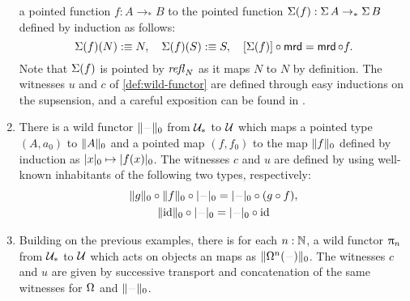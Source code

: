 \documentclass[english,a4]{article}
\def\githubpath{\tt\small}
\renewcommand{\ap}[1]{\left[{#1}\right]}
\newcommand{\ptdto}{\to_\ast}%
\newcommand{\setTrunc}[1]{\Trunc{#1}_0}
\newcommand{\settrunc}[1]{\trunc{#1}_0}
\newcommand{\UUptd}{\UU_{\ast}}
\begin{document}
\begin{example}
\begin{enumerate}
      a pointed function $f:A\ptdto B$ to the pointed function $\susp (f) :
      \susp A \ptdto \susp B$ defined by induction as follows:
      \begin{displaymath}
        \susp (f) (N) \defequi N,\quad
        \susp (f) (S) \defequi S,\quad
        \ap{\susp (f)} \circ \mrd = \mrd \circ f.
      \end{displaymath}
      Note that $\operatorname{\Sigma} (f)$ is pointed by $\mathop{{\mathit{refl}}_{N}}$ as it maps $N$ to $N$
      by definition. The witnesses $u$ and $c$ of \cref{def:wild-functor} are
      defined through easy inductions on the supsension, and a
      careful exposition can be found in
      \cite[\githubpath core/lib/types/Suspension.agda]{hott-agda}.

    \item There is a wild functor $\setTrunc \blank$ from $\UUptd$ to $\mathcal{U}$
      which maps a pointed type $(A,a_0)$ to $\setTrunc{A}$ and a pointed map
      $(f,f_0)$ to the map $\setTrunc f$ defined by induction as $\settrunc x
      \mapsto \settrunc{f(x)}$. The witnesses $c$ and $u$ are defined
      by using well-known inhabitants of the following two types, respectively:
      \begin{gather*}
        \setTrunc g \circ \setTrunc f \circ \settrunc \blank = \settrunc \blank \circ (g\circ f),
        \\
        \setTrunc{\id} \circ \settrunc \blank = \settrunc \blank \circ \id
      \end{gather*}

    \item Building on the previous examples, there is for each $n:\mathbb{N}$, a wild
      functor $\uppi_{n}$ from $\UUptd$ to $\mathcal{U}$ which acts on objects an maps as
      $\setTrunc{\loopspace n (\blank)}$. The witnesses $c$ and $u$ are given by
      successive transport and concatenation of the same witnesses for
      $\loopspace\null$ and $\setTrunc \blank$.
  \end{enumerate}
\end{example}
\end{document}
